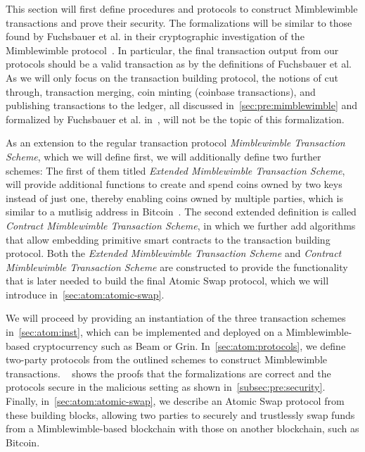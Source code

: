 This section will first define procedures and protocols to construct Mimblewimble transactions and prove their security.
The formalizations will be similar to those found by Fuchsbauer et al. in their cryptographic investigation of the Mimblewimble protocol~\cite{fuchsbauer2019aggregate}.
In particular, the final transaction output from our protocols should be a valid transaction as by the definitions of Fuchsbauer et al.
As we will only focus on the transaction building protocol, the notions of cut through, transaction merging, coin minting (coinbase transactions), and publishing transactions to the ledger, all discussed in~\cref{sec:pre:mimblewimble} and formalized by Fuchsbauer et al. in~\cite{fuchsbauer2019aggregate}, will not be the topic of this formalization.

As an extension to the regular transaction protocol \emph{Mimblewimble Transaction Scheme}, which we will define first, we will additionally define two further schemes:
The first of them titled \emph{Extended Mimblewimble Transaction Scheme}, will provide additional functions to create and spend coins owned by two keys instead of just one, thereby enabling coins owned by multiple parties, which is similar to a mutlisig address in Bitcoin~\cite{antonopoulos2014mastering}.
The second extended definition is called \emph{Contract Mimblewimble Transaction Scheme}, in which we further add algorithms that allow embedding primitive smart contracts to the transaction building protocol.
Both the \emph{Extended Mimblewimble Transaction Scheme} and \emph{Contract Mimblewimble Transaction Scheme} are constructed to provide the functionality that is later needed to build the final Atomic Swap protocol, which we will introduce in~\cref{sec:atom:atomic-swap}.

We will proceed by providing an instantiation of the three transaction schemes in~\cref{sec:atom:inst}, which can be implemented and deployed on a Mimblewimble-based cryptocurrency such as Beam or Grin.
In~\cref{sec:atom:protocols}, we define two-party protocols from the outlined schemes to construct Mimblewimble transactions.
~ shows the proofs that the formalizations are correct and the protocols secure in the malicious setting as shown in~\cref{subsec:pre:security}.
Finally, in~\cref{sec:atom:atomic-swap}, we describe an Atomic Swap protocol from these building blocks, allowing two parties to securely and trustlessly swap funds from a Mimblewimble-based blockchain with those on another blockchain, such as Bitcoin.

